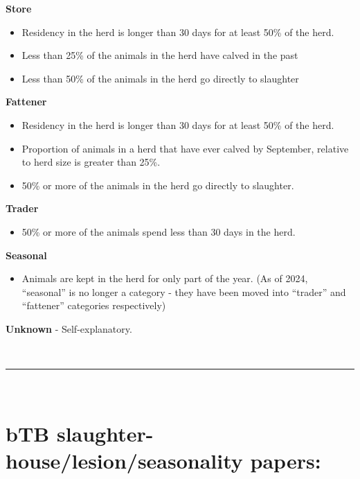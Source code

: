 \documentclass[
  letterpaper,
  DIV=11,
  numbers=noendperiod]{scrreprt}
\providecommand{\tightlist}{%
  \setlength{\itemsep}{0pt}\setlength{\parskip}{0pt}}
\begin{document}
\textbf{Store}

\begin{itemize}
\tightlist
\item
  Residency in the herd is longer than 30 days for at least 50\% of the
  herd.
\item
  Less than 25\% of the animals in the herd have calved in the past
\item
  Less than 50\% of the animals in the herd go directly to slaughter
\end{itemize}

\textbf{Fattener}

\begin{itemize}
\tightlist
\item
  Residency in the herd is longer than 30 days for at least 50\% of the
  herd.
\item
  Proportion of animals in a herd that have ever calved by September,
  relative to herd size is greater than 25\%.
\item
  50\% or more of the animals in the herd go directly to slaughter.
\end{itemize}

\textbf{Trader}

\begin{itemize}
\tightlist
\item
  50\% or more of the animals spend less than 30 days in the herd.
\end{itemize}

\textbf{Seasonal}

\begin{itemize}
\tightlist
\item
  Animals are kept in the herd for only part of the year. (As of 2024,
  ``seasonal'' is no longer a category - they have been moved into
  ``trader'' and ``fattener'' categories respectively)
\end{itemize}

\textbf{Unknown} - Self-explanatory.

\(~\) \(~\)

\begin{center}\rule{0.5\linewidth}{0.5pt}\end{center}

\(~\) \(~\)

\newpage

\section{bTB slaughter-house/lesion/seasonality
papers:}\label{btb-slaughter-houselesionseasonality-papers}
\end{document}
